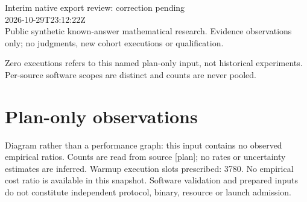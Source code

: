 \documentclass[11pt]{article}
\begin{document}
\raggedright\sloppy
{\LARGE Interim native export review: correction pending}\\[5pt]
2026-10-29T23:12:22Z\\
Public synthetic known-answer mathematical research. Evidence observations only; no judgments, new cohort executions or qualification.

Zero executions refers to this named plan-only input, not historical experiments. Per-source software scopes are distinct and counts are never pooled.
\section*{Plan-only observations}
\begin{center}\end{center}
Diagram rather than a performance graph: this input contains no observed empirical ratios. Counts are read from source [plan]; no rates or uncertainty estimates are inferred.
Warmup execution slots prescribed: 3780. No empirical cost ratio is available in this snapshot. Software validation and prepared inputs do not constitute independent protocol, binary, resource or launch admission.
\end{document}
